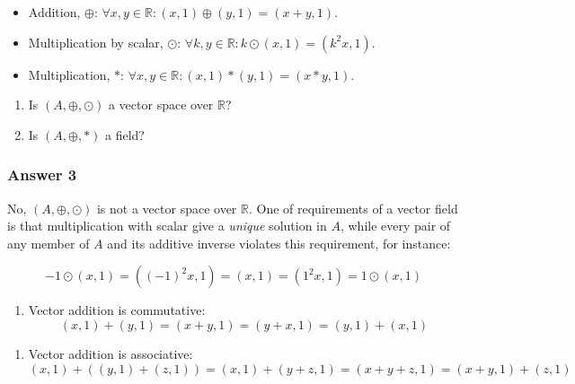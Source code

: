 \documentclass[11pt]{article}
\begin{document}
\begin{itemize}
\item Addition, $\oplus$: 
     $\forall x, y \in \mathbb{R}: (x,1)\oplus(y,1) = (x+y,1)$.
\item Multiplication by scalar, $\odot$:
     $\forall k, y \in \mathbb{R}: k \odot (x,1) = (k^2x,1)$.
\item Multiplication, $*$:
     $\forall x, y \in \mathbb{R}: (x,1)*(y,1) = (x*y,1)$.
\end{itemize}


\begin{enumerate}
\item Is $(A, \oplus, \odot)$ a vector space over $\mathbb{R}$?
\item Is $(A, \oplus, *)$ a field?
\end{enumerate}

\subsubsection{Answer 3}
\label{sec-1-2-1}
No, $(A, \oplus, \odot)$ is not a vector space over $\mathbb{R}$.  One of
requirements of a vector field is that multiplication with scalar give
a \emph{unique} solution in $A$, while every pair of any member of $A$ and
its additive inverse violates this requirement, for instance:

\begin{equation*}
  -1\odot(x,1)=((-1)^2x,1)=(x,1)=(1^2x,1)=1\odot(x,1)
\end{equation*}

\begin{enumerate}
\item Vector addition is commutative:
\begin{equation*}
  (x,1)+(y,1)=(x+y,1)=(y+x,1)=(y,1)+(x,1)
\end{equation*}
\end{enumerate}


\begin{enumerate}
\item Vector addition is associative:
\begin{equation*}
  (x,1)+((y,1)+(z,1))=(x,1)+(y+z,1)=(x+y+z,1)=(x+y,1)+(z,1)
\end{equation*}
\end{enumerate}
\end{document}
